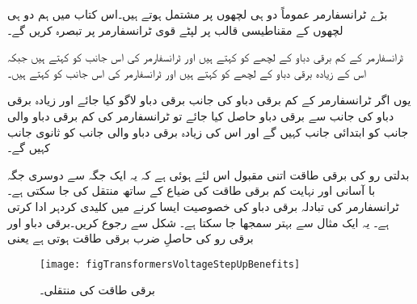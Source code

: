 بڑے ٹرانسفارمر عموماً دو ہی لچھوں پر مشتمل ہوتے ہیں۔اس کتاب میں ہم دو ہی لچھوں کے مقناطیسی قالب پر لپٹے قوی ٹرانسفارمر پر تبصرہ کریں گے۔

	ٹرانسفارمر کے کم برقی دباو کے لچھے کو   کہتے ہیں اور ٹرانسفارمر کی اس جانب کو   کہتے ہیں جبکہ اس کے زیادہ برقی دباو کے لچھے کو   کہتے ہیں اور ٹرانسفارمر کی اس جانب کو   کہتے ہیں۔

یوں اگر ٹرانسفارمر کے کم برقی دباو کی جانب برقی دباو لاگو کیا جائے اور زیادہ برقی دباو کی جانب سے برقی دباو حاصل کیا جائے تو ٹرانسفارمر کی کم برقی دباو والی جانب کو ابتدائی جانب کہیں گے اور اس کی زیادہ برقی دباو والی جانب کو ثانوی جانب کہیں گے۔

بدلتی رو کی برقی طاقت اتنی مقبول اس لئے ہوئی ہے کہ یہ ایک جگہ سے دوسری جگہ با آسانی اور نہایت کم برقی طاقت کی ضیاع کے ساتھ منتقل کی جا سکتی ہے۔ٹرانسفارمر کی تبادلہ برقی دباو کی خصوصیت ایسا کرنے میں کلیدی کردہر ادا کرتی ہے۔ یہ ایک مثال سے بہتر سمجھا جا سکتا ہے۔
%
شکل   سے رجوع کریں۔برقی دباو اور برقی رو کی حاصلِ ضرب برقی طاقت ہوتی ہے یعنی
\begin{figure}
\centering
\texttt{[image: figTransformersVoltageStepUpBenefits]}
\caption{برقی طاقت کی منتقلی۔}
\label{شکل_ٹرانسفارمر_برقی_طاقت_منتقلی}
\end{figure}

